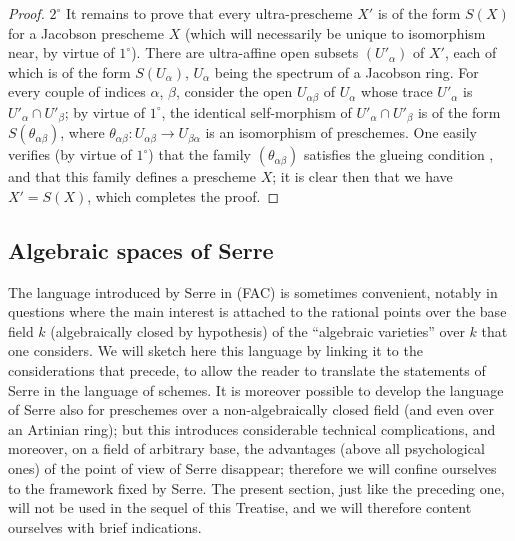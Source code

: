 \begin{proof}
$2^\circ$ It remains to prove that every ultra-prescheme $X'$ is of the form $S(X)$ for a Jacobson prescheme $X$ (which will necessarily be unique to isomorphism near, by virtue of $1^\circ$).
There are ultra-affine open subsets $(U'_\alpha)$ of $X'$, each of which is of the form $S(U_\alpha)$, $U_\alpha$ being the spectrum of a Jacobson ring.
For every couple of indices $\alpha$, $\beta$, consider the open $U_{\alpha\beta}$ of $U_\alpha$ whose trace $U'_\alpha$ is $U'_\alpha\cap U'_\beta$; by virtue of $1^\circ$, the identical self-morphism of $U'_\alpha\cap U'_\beta$ is of the form $S(\theta_{\alpha\beta})$, where $\theta_{\alpha\beta}:U_{\alpha\beta}\to U_{\beta\alpha}$ is an isomorphism of preschemes.
One easily verifies (by virtue of $1^\circ$) that the family $(\theta_{\alpha\beta})$ satisfies the glueing condition , and that this family defines a prescheme $X$; it is clear then that we have $X'=S(X)$, which completes the proof.
\end{proof}

\subsection{Algebraic spaces of Serre}
\label{subsection:IV.10.10}

\begin{env}[10.10.1]
\label{IV.10.10.1}
The language introduced by Serre in (FAC) is sometimes convenient, notably in questions where the main interest is attached to the rational points over the base field $k$ (algebraically closed by hypothesis) of the ``algebraic varieties'' over $k$ that one considers.
We will sketch here this language by linking it to the considerations that precede, to allow the reader to translate the statements of Serre in the language of schemes.
It is moreover possible to develop the language of Serre also for preschemes over a non-algebraically closed field (and even over an Artinian ring); but this introduces considerable technical complications, and moreover, on a field of arbitrary base, the advantages (above all psychological ones) of the point of view of Serre disappear; therefore we will confine ourselves to the framework fixed by Serre.
The present section, just like the preceding one, will not be used in the sequel of this Treatise, and we will therefore content ourselves with brief indications.
\end{env}


